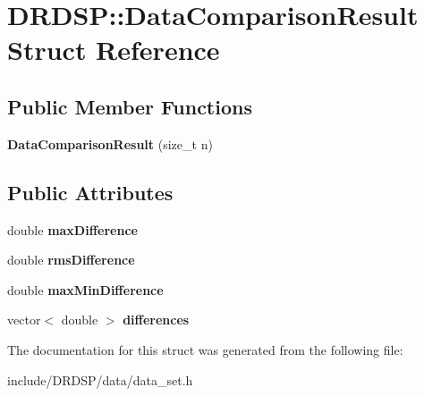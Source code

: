 \hypertarget{struct_d_r_d_s_p_1_1_data_comparison_result}{\section{D\-R\-D\-S\-P\-:\-:Data\-Comparison\-Result Struct Reference}
\label{struct_d_r_d_s_p_1_1_data_comparison_result}
}
\subsection*{Public Member Functions}
\begin{DoxyCompactItemize}
\item 
\hypertarget{struct_d_r_d_s_p_1_1_data_comparison_result_a836559a62d3948177a9218bf014ac6dd}{{\bfseries Data\-Comparison\-Result} (size\-\_\-t n)}\label{struct_d_r_d_s_p_1_1_data_comparison_result_a836559a62d3948177a9218bf014ac6dd}

\end{DoxyCompactItemize}
\subsection*{Public Attributes}
\begin{DoxyCompactItemize}
\item 
\hypertarget{struct_d_r_d_s_p_1_1_data_comparison_result_a4ce2ff6425828a8f17c020dc29a224bd}{double {\bfseries max\-Difference}}\label{struct_d_r_d_s_p_1_1_data_comparison_result_a4ce2ff6425828a8f17c020dc29a224bd}

\item 
\hypertarget{struct_d_r_d_s_p_1_1_data_comparison_result_a73b729d6d48b961cda6731b34dde2e0b}{double {\bfseries rms\-Difference}}\label{struct_d_r_d_s_p_1_1_data_comparison_result_a73b729d6d48b961cda6731b34dde2e0b}

\item 
\hypertarget{struct_d_r_d_s_p_1_1_data_comparison_result_a11db49dda748fabcce43b94748063f27}{double {\bfseries max\-Min\-Difference}}\label{struct_d_r_d_s_p_1_1_data_comparison_result_a11db49dda748fabcce43b94748063f27}

\item 
\hypertarget{struct_d_r_d_s_p_1_1_data_comparison_result_a260e9ad0b2aea4467e5f77b32eac399d}{vector$<$ double $>$ {\bfseries differences}}\label{struct_d_r_d_s_p_1_1_data_comparison_result_a260e9ad0b2aea4467e5f77b32eac399d}

\end{DoxyCompactItemize}


The documentation for this struct was generated from the following file\-:\begin{DoxyCompactItemize}
\item 
include/\-D\-R\-D\-S\-P/data/data\-\_\-set.\-h\end{DoxyCompactItemize}
